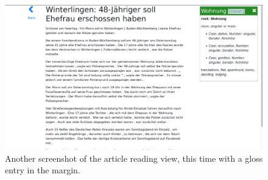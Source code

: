 \begin{figure}[H]
	\caption[Screenshot of the Article Reading View with Gloss]{Another screenshot of the article reading view, this time with a gloss entry in the margin.}
	\label{fig:view4}
	\begin{center}
	\includegraphics[width=\textwidth]{Graphics/View4}
\end{center}
\end{figure}